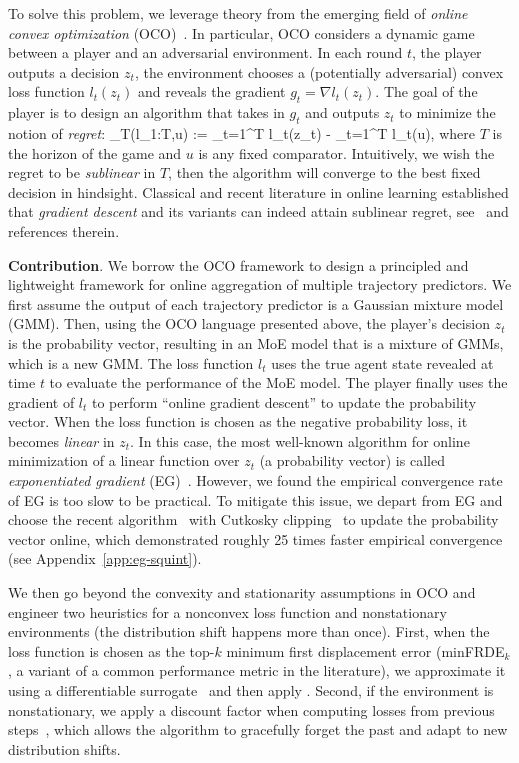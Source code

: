 To solve this problem, we leverage theory from the emerging field of \emph{online convex optimization} (OCO)~\cite{orabona19book-modern}. In particular, OCO considers a dynamic game between a player and an adversarial environment. In each round $t$, the player outputs a decision $z_t$, the environment chooses a (potentially adversarial) convex loss function $l_t(z_t)$ and reveals the gradient $g_t = \nabla l_t(z_t)$. The goal of the player is to design an algorithm that takes in $g_t$ and outputs $z_t$ to minimize the notion of \emph{regret}:
\bea \label{eq:regret}
\regret_T(l_{1:T},u) := \sum_{t=1}^T l_t(z_t) - \sum_{t=1}^T l_t(u),
\eea 
where $T$ is the horizon of the game and $u$ is any fixed comparator. Intuitively, we wish the regret to be \emph{sublinear} in $T$, then the algorithm will converge to the best fixed decision in hindsight. Classical and recent literature in online learning established that \emph{gradient descent} and its variants can indeed attain sublinear regret, see~\cite{orabona19book-modern,zhang2024improving} and references therein.

{\bf Contribution}. 
We borrow the OCO framework to design a principled and lightweight framework for online aggregation of multiple trajectory predictors. We first assume the output of each trajectory predictor is a Gaussian mixture model (GMM). Then, using the OCO language presented above, the player's decision $z_t$ is the probability vector, resulting in an MoE model that is a mixture of GMMs, which is a new GMM. The loss function $l_t$ uses the true agent state revealed at time $t$ to evaluate the performance of the MoE model. The player finally uses the gradient of $l_t$ to perform ``online gradient descent'' to update the probability vector. When the loss function is chosen as the negative probability loss, it becomes \emph{linear} in $z_t$. In this case, the most well-known algorithm for online minimization of a linear function over $z_t$ (a probability vector) is called \emph{exponentiated gradient} (EG)~\cite{orabona19book-modern}. However, we found the empirical convergence rate of EG is too slow to be practical. To mitigate this issue, we depart from EG and choose the recent \squint algorithm~\cite{koolen2015secondorder} with Cutkosky clipping~\cite{cutkosky2019artificial} to update the probability vector online, which demonstrated roughly 25 times faster empirical convergence (see Appendix~\ref{app:eg-squint}).

We then go beyond the convexity and stationarity assumptions in OCO and engineer two heuristics for a nonconvex loss function and nonstationary environments (\ie the distribution shift happens more than once). First, when the loss function is chosen as the top-$k$ minimum first displacement error (minFRDE$_{k}$, a variant of a common performance metric in the literature), we approximate it using a differentiable surrogate~\cite{grover2019stochastic} and then apply \squint. Second, if the environment is nonstationary, we apply a discount factor when computing losses from previous steps~\cite{zhang2024discountedn}, which allows the algorithm to gracefully forget the past and adapt to new distribution shifts. 

